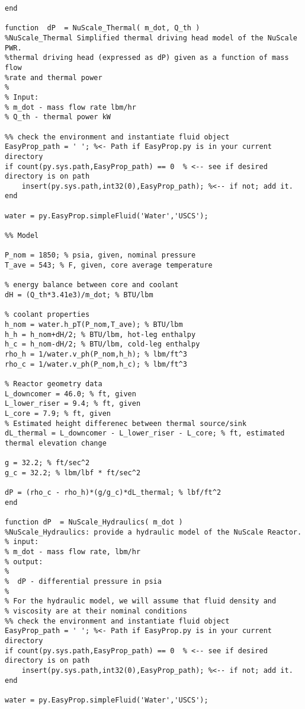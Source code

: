 \begin{fullwidth}
\begin{lstlisting}
end

function  dP  = NuScale_Thermal( m_dot, Q_th )
%NuScale_Thermal Simplified thermal driving head model of the NuScale PWR.
%thermal driving head (expressed as dP) given as a function of mass flow
%rate and thermal power
%
% Input:
% m_dot - mass flow rate lbm/hr
% Q_th - thermal power kW

%% check the environment and instantiate fluid object
EasyProp_path = ' '; %<- Path if EasyProp.py is in your current directory
if count(py.sys.path,EasyProp_path) == 0  % <-- see if desired directory is on path
    insert(py.sys.path,int32(0),EasyProp_path); %<-- if not; add it.
end

water = py.EasyProp.simpleFluid('Water','USCS');

%% Model

P_nom = 1850; % psia, given, nominal pressure
T_ave = 543; % F, given, core average temperature

% energy balance between core and coolant
dH = (Q_th*3.41e3)/m_dot; % BTU/lbm

% coolant properties
h_nom = water.h_pT(P_nom,T_ave); % BTU/lbm
h_h = h_nom+dH/2; % BTU/lbm, hot-leg enthalpy
h_c = h_nom-dH/2; % BTU/lbm, cold-leg enthalpy
rho_h = 1/water.v_ph(P_nom,h_h); % lbm/ft^3
rho_c = 1/water.v_ph(P_nom,h_c); % lbm/ft^3

% Reactor geometry data
L_downcomer = 46.0; % ft, given
L_lower_riser = 9.4; % ft, given
L_core = 7.9; % ft, given
% Estimated height differenec between thermal source/sink
dL_thermal = L_downcomer - L_lower_riser - L_core; % ft, estimated thermal elevation change

g = 32.2; % ft/sec^2
g_c = 32.2; % lbm/lbf * ft/sec^2

dP = (rho_c - rho_h)*(g/g_c)*dL_thermal; % lbf/ft^2 
end

function dP  = NuScale_Hydraulics( m_dot )
%NuScale_Hydraulics: provide a hydraulic model of the NuScale Reactor.
% input:
% m_dot - mass flow rate, lbm/hr
% output:
%
%  dP - differential pressure in psia
%
% For the hydraulic model, we will assume that fluid density and
% viscosity are at their nominal conditions
%% check the environment and instantiate fluid object
EasyProp_path = ' '; %<- Path if EasyProp.py is in your current directory
if count(py.sys.path,EasyProp_path) == 0  % <-- see if desired directory is on path
    insert(py.sys.path,int32(0),EasyProp_path); %<-- if not; add it.
end

water = py.EasyProp.simpleFluid('Water','USCS');


\end{lstlisting}
\end{fullwidth}
